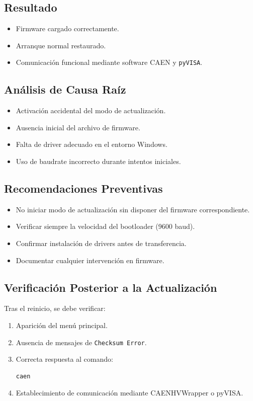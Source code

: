 \documentclass{article}
\begin{document}
\subsection{Resultado}

\begin{itemize}
    \item Firmware cargado correctamente.
    \item Arranque normal restaurado.
    \item Comunicación funcional mediante software CAEN y \texttt{pyVISA}.
\end{itemize}

\subsection{Análisis de Causa Raíz}

\begin{itemize}
    \item Activación accidental del modo de actualización.
    \item Ausencia inicial del archivo de firmware.
    \item Falta de driver adecuado en el entorno Windows.
    \item Uso de baudrate incorrecto durante intentos iniciales.
\end{itemize}

\subsection*{Recomendaciones Preventivas}

\begin{itemize}
    \item No iniciar modo de actualización sin disponer del firmware correspondiente.
    \item Verificar siempre la velocidad del bootloader (9600 baud).
    \item Confirmar instalación de drivers antes de transferencia.
    \item Documentar cualquier intervención en firmware.
\end{itemize}

\subsection{Verificación Posterior a la Actualización}

Tras el reinicio, se debe verificar:

\begin{enumerate}
    \item Aparición del menú principal.
    \item Ausencia de mensajes de \texttt{Checksum Error}.
    \item Correcta respuesta al comando:
\begin{verbatim}
caen
\end{verbatim}
    \item Establecimiento de comunicación mediante CAENHVWrapper o pyVISA.
\end{enumerate}
\end{document}
